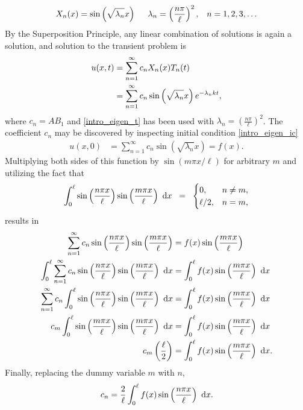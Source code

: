 \begin{align}
  \label{intro_eigen_x}
  X_n(x) = \sin\left( \sqrt{\lambda_n} x \right) \hspace{5mm}
  \lambda_n = \left( \frac{n \pi}{\ell} \right)^2, &&n = 1,2,3,\dots
\end{align}
By the Superposition Principle, any linear combination of solutions is again a solution, and solution to the transient problem is
\begin{align}
  u(x,t) &= \sum_{n=1}^{\infty} c_n X_n(x) T_n(t) \notag \\
  \label{intro_eigen_fourier_soln}
         &= \sum_{n=1}^{\infty} c_n \sin\left( \sqrt{\lambda_n} x \right) e^{-\lambda_n k t},
\end{align}
where $c_n = A B_1$ and \cref{intro_eigen_t} has been used with $\lambda_n = \left( \frac{n \pi}{\ell} \right)^2$.  The coefficient $c_n$ may be discovered by inspecting initial condition \cref{intro_eigen_ic}
\begin{align*}
  u(x,0) &= \sum_{n=1}^{\infty} c_n \sin\left( \sqrt{\lambda_n} x \right) = f(x).
\end{align*}
Multiplying both sides of this function by $\sin(m\pi x/\ell)$ for arbitrary $m$ and utilizing the fact that
\begin{align*}
  \int_{0}^{\ell} \sin\left(\frac{n\pi x}{\ell}\right) \sin\left(\frac{m\pi x}{\ell}\right) \ \mathrm{d}x \hspace{2mm} = \hspace{2mm}
  \begin{cases}
    0,      & n \neq m, \\
    \ell/2, & n = m,
  \end{cases}
\end{align*}
results in
{\footnotesize
\begin{align*}
  \sum_{n=1}^{\infty} c_n \sin\left( \frac{n\pi x}{\ell} \right) \sin\left(\frac{m\pi x}{\ell} \right) &= f(x) \sin\left( \frac{m\pi x}{\ell} \right) \\
  \int_{0}^{\ell} \sum_{n=1}^{\infty} c_n \sin\left( \frac{n\pi x}{\ell} \right) \sin\left(\frac{m\pi x}{\ell} \right) \ \mathrm{d}x &= \int_{0}^{\ell} f(x) \sin\left( \frac{m\pi x}{\ell} \right) \ \mathrm{d}x \\
  \sum_{n=1}^{\infty} c_n \int_{0}^{\ell} \sin\left( \frac{n\pi x}{\ell} \right) \sin\left(\frac{m\pi x}{\ell} \right) \ \mathrm{d}x &= \int_{0}^{\ell} f(x) \sin\left( \frac{m\pi x}{\ell} \right) \ \mathrm{d}x \\
  c_m \int_{0}^{\ell} \sin\left( \frac{m\pi x}{\ell} \right) \sin\left(\frac{m\pi x}{\ell} \right) \ \mathrm{d}x &= \int_{0}^{\ell} f(x) \sin\left( \frac{m\pi x}{\ell} \right) \ \mathrm{d}x \\
  c_m \left( \frac{\ell}{2} \right) &= \int_{0}^{\ell} f(x) \sin\left( \frac{m\pi x}{\ell} \right) \ \mathrm{d}x.
\end{align*}}
Finally, replacing the dummy variable $m$ with $n$,
\begin{align}
  \label{intro_eigen_fourier_coef}
  c_n = \frac{2}{\ell} \int_{0}^{\ell} f(x) \sin\left( \frac{n\pi x}{\ell} \right) \ \mathrm{d}x.
\end{align}

